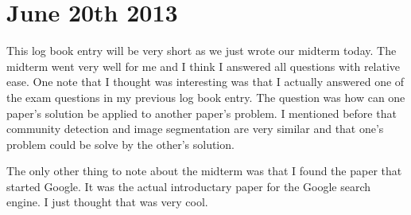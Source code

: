 \documentclass[conference]{IEEEtran}
\begin{document}
\section{June 20th 2013}
This log book entry will be very short as we just wrote our midterm today. The midterm went very well
for me and I think I answered all questions with relative ease. One note that I thought was interesting
was that I actually answered one of the exam questions in my previous log book entry. The question was
how can one paper's solution be applied to another paper's problem. I mentioned before that community
detection and image segmentation are very similar and that one's problem could be solve by the other's
solution.

The only other thing to note about the midterm was that I found the paper that started Google. It was
the actual introductary paper for the Google search engine. I just thought that was very cool.
\end{document}
